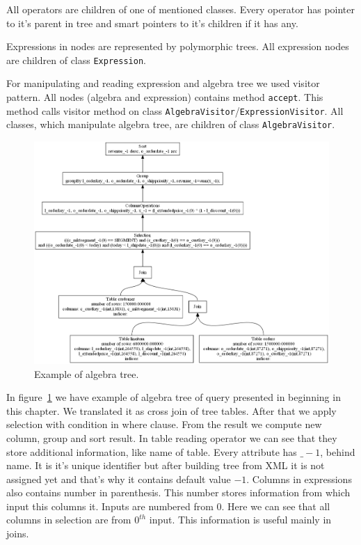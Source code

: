 All operators are children of one of mentioned classes. Every operator has pointer to it's parent in tree and smart pointers to it's children if it has any. 

Expressions in nodes are represented by polymorphic trees. All expression nodes are children of class \texttt{Expression}.

For manipulating and reading expression and algebra tree we used visitor pattern. All nodes (algebra and expression) contains method \texttt{accept}. This method calls visitor method on class \texttt{AlgebraVisitor}/\texttt{ExpressionVisitor}. All classes, which manipulate algebra tree, are children of class \texttt{AlgebraVisitor}.


\begin{figure}[h!]
  \centering
    \includegraphics[width=1.0\textwidth]{algebratree1}

      \caption{Example of algebra tree.}
          \label{fig:algebratree1}
\end{figure}

In figure~\ref{fig:algebratree1} we have example of algebra tree of query presented in beginning in this chapter. We translated it as cross join of tree tables. After that we apply selection with condition in where clause. From the result we compute new column, group and sort result. In table reading operator we can see that they store additional information, like name of table. Every attribute has $\_-1$, behind name. It is it's unique identifier but after building tree from XML it is not assigned yet and that's why it contains default value $-1$. Columns in expressions also contains number in parenthesis. This number stores information from which input this columns it. Inputs are numbered from $0$. Here we can see that all columns in selection are from $0^{th}$ input. This information is useful mainly in joins.

